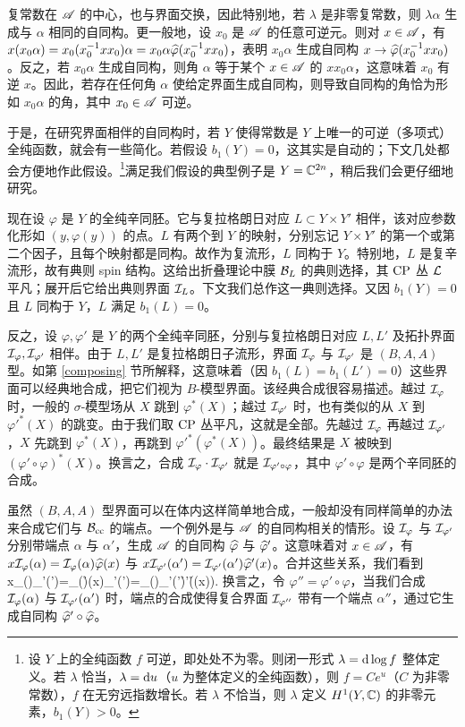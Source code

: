 复常数在 ${\mathscr A}$ 的中心，也与界面交换，因此特别地，若 $\lambda$ 是非零复常数，则 $\lambda\alpha$ 生成与 $\alpha$ 相同的自同构。更一般地，设 $x_0$ 是 ${\mathscr A}$ 的任意可逆元。则对 $x\in{\mathscr A}$，有 $x(x_0\alpha)=x_0(x_0^{-1}xx_0)\alpha=x_0\alpha\widehat\varphi(x_0^{-1}xx_0)$，表明 $x_0\alpha$ 生成自同构 $x\to\widehat\varphi(x_0^{-1}xx_0)$。反之，若 $x_0\alpha$ 生成自同构，则角 $\alpha$ 等于某个 $x\in{\mathscr A}$ 的 $xx_0\alpha$，这意味着 $x_0$ 有逆 $x$。因此，若存在任何角 $\alpha$ 使给定界面生成自同构，则导致自同构的角恰为形如 $x_0\alpha$ 的角，其中 $x_0\in{\mathscr A}$ 可逆。

于是，在研究界面相伴的自同构时，若 $Y$ 使得常数是 $Y$ 上唯一的可逆（多项式）全纯函数，就会有一些简化。若假设 $b_1(Y)=0$，这其实是自动的；下文几处都会方便地作此假设。\footnote{设 $Y$ 上的全纯函数 $f$ 可逆，即处处不为零。则闭一形式 $\lambda={\mathrm d}\log f$ 整体定义。若 $\lambda$ 恰当，$\lambda={\mathrm d} u$（$u$ 为整体定义的全纯函数），则 $f=Ce^u$（$C$ 为非零常数），$f$ 在无穷远指数增长。若 $\lambda$ 不恰当，则 $\lambda$ 定义 $H^1(Y,{\mathbb C})$ 的非零元素，$b_1(Y)>0$。}满足我们假设的典型例子是 $Y={\mathbb C}^{2n}$，稍后我们会更仔细地研究。

现在设 $\varphi$ 是 $Y$ 的全纯辛同胚。它与复拉格朗日对应 $L\subset Y\times Y'$ 相伴，该对应参数化形如 $(y,\varphi(y))$ 的点。$L$ 有两个到 $Y$ 的映射，分别忘记 $Y\times Y'$ 的第一个或第二个因子，且每个映射都是同构。故作为复流形，$L$ 同构于 $Y$。特别地，$L$ 是复辛流形，故有典则 spin 结构。这给出折叠理论中膜 ${\mathcal B}_L$ 的典则选择，其 ${\mathrm{CP}}$ 丛 ${\mathcal L}$ 平凡；展开后它给出典则界面 ${\mathcal I}_L$。下文我们总作这一典则选择。又因 $b_1(Y)=0$ 且 $L$ 同构于 $Y$，$L$ 满足 $b_1(L)=0$。

反之，设 $\varphi,\varphi'$ 是 $Y$ 的两个全纯辛同胚，分别与复拉格朗日对应 $L,L'$ 及拓扑界面 ${\mathcal I}_\varphi,{\mathcal I}_{\varphi'}$ 相伴。由于 $L,L'$ 是复拉格朗日子流形，界面 ${\mathcal I}_\varphi$ 与 ${\mathcal I}_{\varphi'}$ 是 $(B,A,A)$ 型。如第 \ref{composing} 节所解释，这意味着（因 $b_1(L)=b_1(L')=0$）这些界面可以经典地合成，把它们视为 $B$-模型界面。该经典合成很容易描述。越过 ${\mathcal I}_\varphi$ 时，一般的 $\sigma$-模型场从 $X$ 跳到 $\varphi^*(X)$；越过 ${\mathcal I}_{\varphi'}$ 时，也有类似的从 $X$ 到 $\varphi'^*(X)$ 的跳变。由于我们取 ${\mathrm{CP}}$ 丛平凡，这就是全部。先越过 ${\mathcal I}_\varphi$ 再越过 ${\mathcal I}_{\varphi'}$，$X$ 先跳到 $\varphi^*(X)$，再跳到 $\varphi'^*(\varphi^*(X))$。最终结果是 $X$ 被映到 $(\varphi'\circ\varphi)^*(X)$。换言之，合成 ${\mathcal I}_\varphi\cdot{\mathcal I}_{\varphi'}$ 就是 ${\mathcal I}_{\varphi'\circ\varphi}$，其中 $\varphi'\circ\varphi$ 是两个辛同胚的合成。

虽然 $(B,A,A)$ 型界面可以在体内这样简单地合成，一般却没有同样简单的办法来合成它们与 ${\mathcal B}_{\mathrm{cc}}$ 的端点。一个例外是与 ${\mathscr A}$ 的自同构相关的情形。设 ${\mathcal I}_\varphi$ 与 ${\mathcal I}_{\varphi'}$ 分别带端点 $\alpha$ 与 $\alpha'$，生成 ${\mathscr A}$ 的自同构 $\widehat\varphi$ 与 $\widehat\varphi'$。这意味着对 $x\in{\mathscr A}$，有 $x{\mathcal I}_\varphi(\alpha)={\mathcal I}_\varphi(\alpha)\widehat\varphi(x)$ 与 $x{\mathcal I}_{\varphi'}(\alpha')={\mathcal I}_{\varphi'}(\alpha')\widehat\varphi'(x)$。合并这些关系，我们看到
\be\label{toolong}x\I_\varphi(\alpha)\I_{\varphi'}(\alpha')=\I_\varphi(\alpha)\h\varphi(x)\I_{\varphi'}(\alpha')=\I_\varphi(\alpha)\I_{\varphi'}(\alpha')\h\varphi'(\h\varphi(x)).\ee
换言之，令 $\varphi''=\varphi'\circ\varphi$，当我们合成 ${\mathcal I}_\varphi(\alpha)$ 与 ${\mathcal I}_{\varphi'}(\alpha')$ 时，端点的合成使得复合界面 ${\mathcal I}_{\varphi''}$ 带有一个端点 $\alpha''$，通过它生成自同构 $\widehat\varphi'\circ\widehat\varphi$。

